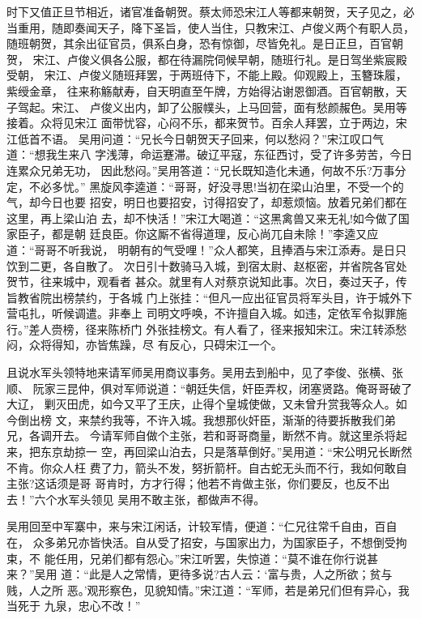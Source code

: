 时下又值正旦节相近，诸官准备朝贺。蔡太师恐宋江人等都来朝贺，天子见之，必
当重用，随即奏闻天子，降下圣旨，使人当住，只教宋江、卢俊义两个有职人员，
随班朝贺，其余出征官员，俱系白身，恐有惊御，尽皆免礼。是日正旦，百官朝贺，
宋江、卢俊义俱各公服，都在待漏院伺候早朝，随班行礼。是日驾坐紫宸殿受朝，
宋江、卢俊义随班拜罢，于两班侍下，不能上殿。仰观殿上，玉簪珠履，紫绶金章，
往来称觞献寿，自天明直至午牌，方始得沾谢恩御酒。百官朝散，天子驾起。宋江、
卢俊义出内，卸了公服幞头，上马回营，面有愁颜赧色。吴用等接着。众将见宋江
面带忧容，心闷不乐，都来贺节。百余人拜罢，立于两边，宋江低首不语。
吴用问道：“兄长今日朝贺天子回来，何以愁闷？”宋江叹口气道：“想我生来八
字浅薄，命运蹇滞。破辽平寇，东征西讨，受了许多劳苦，今日连累众兄弟无功，
因此愁闷。”吴用答道：“兄长既知造化未通，何故不乐?万事分定，不必多忧。”
黑旋风李逵道：“哥哥，好没寻思!当初在梁山泊里，不受一个的气，却今日也要
招安，明日也要招安，讨得招安了，却惹烦恼。放着兄弟们都在这里，再上梁山泊
去，却不快活！”宋江大喝道：“这黑禽兽又来无礼!如今做了国家臣子，都是朝
廷良臣。你这厮不省得道理，反心尚兀自未除！”李逵又应道：“哥哥不听我说，
明朝有的气受哩！”众人都笑，且捧酒与宋江添寿。是日只饮到二更，各自散了。
次日引十数骑马入城，到宿太尉、赵枢密，并省院各官处贺节，往来城中，观看者
甚众。就里有人对蔡京说知此事。次日，奏过天子，传旨教省院出榜禁约，于各城
门上张挂：“但凡一应出征官员将军头目，许于城外下营屯扎，听候调遣。非奉上
司明文呼唤，不许擅自入城。如违，定依军令拟罪施行。”差人赍榜，径来陈桥门
外张挂榜文。有人看了，径来报知宋江。宋江转添愁闷，众将得知，亦皆焦躁，尽
有反心，只碍宋江一个。

且说水军头领特地来请军师吴用商议事务。吴用去到船中，见了李俊、张横、张顺、
阮家三昆仲，俱对军师说道：“朝廷失信，奸臣弄权，闭塞贤路。俺哥哥破了大辽，
剿灭田虎，如今又平了王庆，止得个皇城使做，又未曾升赏我等众人。如今倒出榜
文，来禁约我等，不许入城。我想那伙奸臣，渐渐的待要拆散我们弟兄，各调开去。
今请军师自做个主张，若和哥哥商量，断然不肯。就这里杀将起来，把东京劫掠一
空，再回梁山泊去，只是落草倒好。”吴用道：“宋公明兄长断然不肯。你众人枉
费了力，箭头不发，努折箭杆。自古蛇无头而不行，我如何敢自主张?这话须是哥
哥肯时，方才行得；他若不肯做主张，你们要反，也反不出去！”六个水军头领见
吴用不敢主张，都做声不得。

吴用回至中军寨中，来与宋江闲话，计较军情，便道：“仁兄往常千自由，百自在，
众多弟兄亦皆快活。自从受了招安，与国家出力，为国家臣子，不想倒受拘束，不
能任用，兄弟们都有怨心。”宋江听罢，失惊道：“莫不谁在你行说甚来？”吴用
道：“此是人之常情，更待多说?古人云：‘富与贵，人之所欲；贫与贱，人之所
恶。’观形察色，见貌知情。”宋江道：“军师，若是弟兄们但有异心，我当死于
九泉，忠心不改！”

